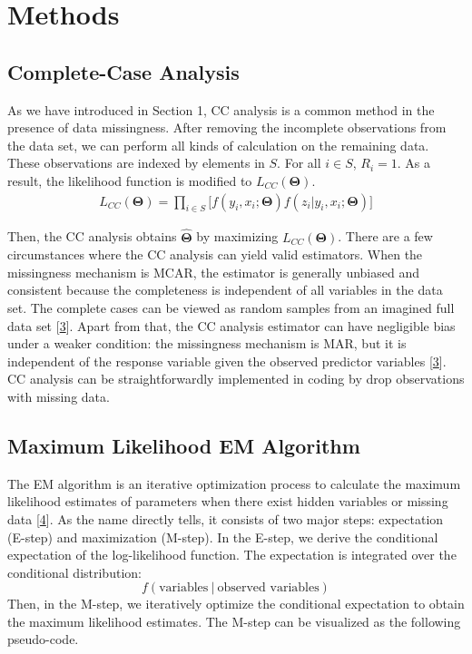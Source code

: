 \documentclass[
  twocolumn]{article}
\begin{document}
\hypertarget{methods}{%
\section{Methods}\label{methods}}

\hypertarget{complete-case-analysis}{%
\subsection{Complete-Case Analysis}\label{complete-case-analysis}}

As we have introduced in Section 1, CC analysis is a common method in
the presence of data missingness. After removing the incomplete
observations from the data set, we can perform all kinds of calculation
on the remaining data. These observations are indexed by elements in
\(S\). For all \(i \in S\), \(R_i = 1\). As a result, the likelihood
function is modified to \(L_{CC}(\boldsymbol{\Theta})\).\\
\[
\begin{aligned}
L_{CC}(\boldsymbol\Theta)
= \prod_{i \in S} \big[ f(y_i, x_i; \boldsymbol\Theta)f(z_i|y_i, x_i; \boldsymbol\Theta) \big]
\end{aligned}
\]

Then, the CC analysis obtains \(\hat{\boldsymbol\Theta}\) by maximizing
\(L_{CC}(\boldsymbol\Theta)\). There are a few circumstances where the
CC analysis can yield valid estimators. When the missingness mechanism
is MCAR, the estimator is generally unbiased and consistent because the
completeness is independent of all variables in the data set. The
complete cases can be viewed as random samples from an imagined full
data set {[}\protect\hyperlink{ref-seaman2013review}{3}{]}. Apart from
that, the CC analysis estimator can have negligible bias under a weaker
condition: the missingness mechanism is MAR, but it is independent of
the response variable given the observed predictor variables
{[}\protect\hyperlink{ref-seaman2013review}{3}{]}. CC analysis can be
straightforwardly implemented in coding by drop observations with
missing data.

\hypertarget{maximum-likelihood-em-algorithm}{%
\subsection{Maximum Likelihood EM
Algorithm}\label{maximum-likelihood-em-algorithm}}

The EM algorithm is an iterative optimization process to calculate the
maximum likelihood estimates of parameters when there exist hidden
variables or missing data
{[}\protect\hyperlink{ref-dempster1977maximum}{4}{]}. As the name
directly tells, it consists of two major steps: expectation (E-step) and
maximization (M-step). In the E-step, we derive the conditional
expectation of the log-likelihood function. The expectation is
integrated over the conditional distribution:
\[f(\text{variables}~|~\text{observed variables})\] Then, in the M-step,
we iteratively optimize the conditional expectation to obtain the
maximum likelihood estimates. The M-step can be visualized as the
following pseudo-code.
\end{document}

